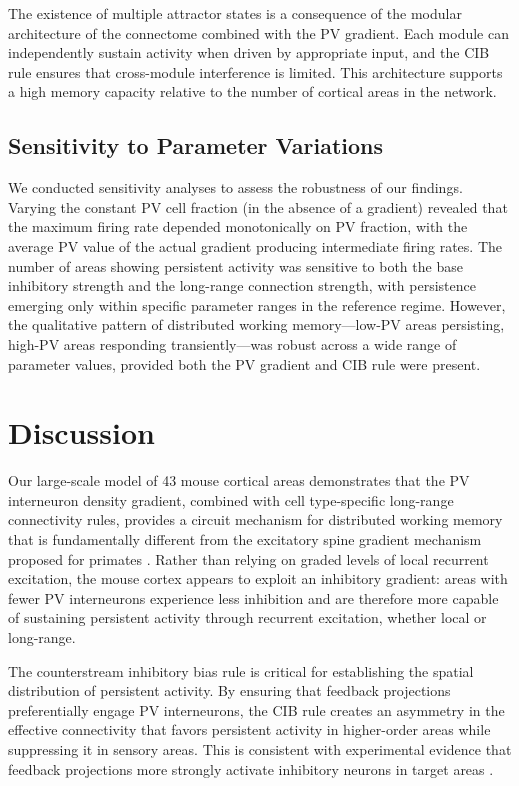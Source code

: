 \documentclass[11pt]{article}
\begin{document}
The existence of multiple attractor states is a consequence of the modular architecture of the connectome combined with the PV gradient. Each module can independently sustain activity when driven by appropriate input, and the CIB rule ensures that cross-module interference is limited. This architecture supports a high memory capacity relative to the number of cortical areas in the network.

\subsection{Sensitivity to Parameter Variations}

We conducted sensitivity analyses to assess the robustness of our findings. Varying the constant PV cell fraction (in the absence of a gradient) revealed that the maximum firing rate depended monotonically on PV fraction, with the average PV value of the actual gradient producing intermediate firing rates. The number of areas showing persistent activity was sensitive to both the base inhibitory strength and the long-range connection strength, with persistence emerging only within specific parameter ranges in the reference regime. However, the qualitative pattern of distributed working memory---low-PV areas persisting, high-PV areas responding transiently---was robust across a wide range of parameter values, provided both the PV gradient and CIB rule were present.

\section{Discussion}

Our large-scale model of 43 mouse cortical areas demonstrates that the PV interneuron density gradient, combined with cell type-specific long-range connectivity rules, provides a circuit mechanism for distributed working memory that is fundamentally different from the excitatory spine gradient mechanism proposed for primates \citep{wang2020,murray2014}. Rather than relying on graded levels of local recurrent excitation, the mouse cortex appears to exploit an inhibitory gradient: areas with fewer PV interneurons experience less inhibition and are therefore more capable of sustaining persistent activity through recurrent excitation, whether local or long-range.

The counterstream inhibitory bias rule is critical for establishing the spatial distribution of persistent activity. By ensuring that feedback projections preferentially engage PV interneurons, the CIB rule creates an asymmetry in the effective connectivity that favors persistent activity in higher-order areas while suppressing it in sensory areas. This is consistent with experimental evidence that feedback projections more strongly activate inhibitory neurons in target areas \citep{markov2014,defelipe2002}.
\end{document}
